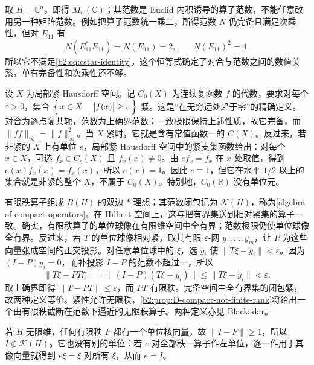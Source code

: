取 \(H=\mathbb C^n\)，即得 \(M_n(\mathbb C)\)；其范数是 Euclid 内积诱导的算子范数，不能任意改用另一种矩阵范数。例如把算子范数统一乘二，所得范数 \(N\) 仍完备且满足次乘性，但对 \(E_{11}\) 有
\[
	N(E_{11}^*E_{11})=N(E_{11})=2, \qquad N(E_{11})^2=4.
\]
所以它不满足\eqref{b2:eq:cstar-identity}。这个恒等式确定了对合与范数之间的数值关系，单有完备性和次乘性还不够。

\ProseParagraphBreak
设 \(X\) 为局部紧 Hausdorff 空间。记 \(C_0(X)\) 为连续复函数 \(f\) 的代数，要求对每个 \(\varepsilon>0\)，集合 \(\Bigl\{\,x\in X\,\Bigm|\,\bigl|f(x)\bigr|\ge\varepsilon\,\Bigr\}\) 紧。这是“在无穷远处趋于零”的精确定义。对合为逐点复共轭，范数为上确界范数；一致极限保持上述性质，故它完备，而 \(\|\bar f f\|_\infty=\|f\|_\infty^2\)。当 \(X\) 紧时，它就是含有常值函数一的 \(C(X)\)。反过来，若非紧的 \(X\) 上有单位 \(e\)，局部紧 Hausdorff 空间中的紧支集函数给出：对每个 \(x\in X\)，可选 \(f_x\in C_c(X)\) 且 \(f_x(x)\ne0\)。由 \(ef_x=f_x\) 在 \(x\) 处取值，得到 \(e(x)f_x(x)=f_x(x)\)，所以 \(e(x)=1\)。因此 \(e\equiv1\)，但它在水平 \(1/2\) 以上的集合就是非紧的整个 \(X\)，不属于 \(C_0(X)\)。特别地，\(C_0(\mathbb R)\) 没有单位元。

\ProseParagraphBreak
有限秩算子组成 \(B(H)\) 的双边 \(*\)-理想；其范数闭包记为 \(\mathcal K(H)\)，称为[algebra of compact operators]。在 Hilbert 空间上，这与把有界集送到相对紧集的算子一致。确实，有限秩算子的单位球像在有限维空间中全有界；范数极限仍使单位球像全有界。反过来，若 \(T\) 的单位球像相对紧，取其有限 \(\varepsilon\)-网 \(y_1,\ldots,y_m\)，让 \(P\) 为这些向量张成空间的正交投影。对任意单位球中的 \(\xi\)，选 \(y_i\) 使 \(\|T\xi-y_i\|<\varepsilon\)。因为 \((I-P)y_i=0\)，而补投影 \(I-P\) 的范数不超过一，所以
\[
	\|T\xi-PT\xi\|=\|(I-P)(T\xi-y_i)\| \le\|T\xi-y_i\|<\varepsilon.
\]
取上确界即得 \(\|T-PT\|\le\varepsilon\)，而 \(PT\) 有限秩。完备空间中全有界集的闭包紧，故两种定义等价。紧性允许无限秩，\cref{b2:prop:D-compact-not-finite-rank}将给出一个由有限秩截断在范数下逼近的无限秩算子。两种定义亦见 Blackadar\cite[\nopp I.8.1.1; I.8.1.5]{Blackadar2017OperatorAlgebrasCorrected}。

\ProseParagraphBreak
若 \(H\) 无限维，任何有限秩 \(F\) 都有一个单位核向量，故 \(\|I-F\|\ge1\)，所以 \(I\notin\mathcal K(H)\)。它也没有别的单位：若 \(e\) 对全部秩一算子作左单位，逐一作用于其像向量就得到 \(e\xi=\xi\) 对所有 \(\xi\)，从而 \(e=I\)。

